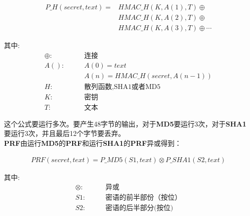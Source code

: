 \documentclass[11pt,dvips]{article}
\newcommand{\bfs}[1]{{\bf{#1}}}
\begin{document}
\begin{eqnarray}
        P\_H(secret, text) =& HMAC\_H(K,A(1),T)\oplus {} \nonumber\\
                           &HMAC\_H(K,A(2),T)\oplus  \nonumber \\
                           &HMAC\_H(K,A(3),T)\oplus \cdots \nonumber
\end{eqnarray}

\begin{center}
\begin{minipage}[t]{0.4\textwidth}
        其中:
\begin{align*}
        \oplus:\qquad &\text{连接}\\
            A():\qquad &A(0) = text {} \\
                 \qquad& A(n) = HMAC\_H(secret,A(n-1)) {} \\
              H: \qquad &\text{散列函数,SHA1或者MD5} {}\\
              K: \qquad &\text{密钥} {}\\
              T: \qquad &\text{文本} {}
\end{align*}
\end{minipage}
\end{center}

这个公式要运行多次。要产生48字节的输出，对于\bfs{MD5}要运行3次，对于\bfs{SHA1}要运行3次，并且最后12个字节要丢弃。\\

\bfs{PRF}由运行\bfs{MD5}的\bfs{PRF}和运行\bfs{SHA1}的\bfs{PRF}异或得到：

\begin{eqnarray}
        PRF(secret,text) =  P\_MD5(S1,text) \otimes P\_SHA1(S2,text) \nonumber
\end{eqnarray}

\begin{center}
        \begin{minipage}[t]{0.4\textwidth}
               其中:
               \begin{align*}
                       \otimes:\qquad &\text{异或} \\
                            S1:\qquad &\text{密语的前半部份（按位}）\\
                            S2:\qquad &\text{密语的后半部分(按位)}
               \end{align*}

       \end{minipage}
\end{center}
\end{document}
